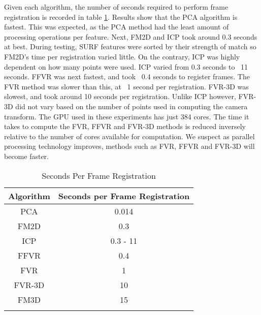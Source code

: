 Given each algorithm, the number of seconds required to perform frame registration is recorded in table \ref{tab:SECSPERFR}. Results show that the PCA algorithm is fastest. This was expected, as the PCA method had the least amount of processing operations per feature. Next, FM2D and ICP took around 0.3 seconds at best. During testing, SURF features were sorted by their strength of match so FM2D's time per registration varied little. On the contrary, ICP was highly dependent on how many points were used. ICP varied from 0.3 seconds to ~11 seconds. FFVR was next fastest, and took ~0.4 seconds to register frames. The FVR method was slower than this, at ~1 second per registration. FVR-3D was slowest, and took around 10 seconds per registration. Unlike ICP however, FVR-3D did not vary based on the number of points used in computing the camera transform. The GPU used in these experiments has just 384 cores. The time it takes to compute the FVR, FFVR and FVR-3D methods is reduced inversely relative to the number of cores available for computation. We suspect as parallel processing technology improves, methods such as FVR, FFVR and FVR-3D will become faster. 

\begin{table}[h]
\centering
\caption{FVR Comparison Table \label{tab:GridRT}}
\label{tab:ExperimentsBooleanSummary}
\end{table}


\begin{table}[!t]
\centering
\begin{tabular}{cc}\hline
\textbf{Algorithm} & \textbf{Seconds per Frame Registration}\\ \hline
PCA & 0.014\\
FM2D & 0.3\\
ICP & 0.3 - 11\\
FFVR & 0.4\\
FVR & 1\\
FVR-3D & 10\\
FM3D & 15\\
\\
\end{tabular}
\\[10pt]
\caption{Seconds Per Frame Registration}
\label{tab:SECSPERFR}
\end{table}


